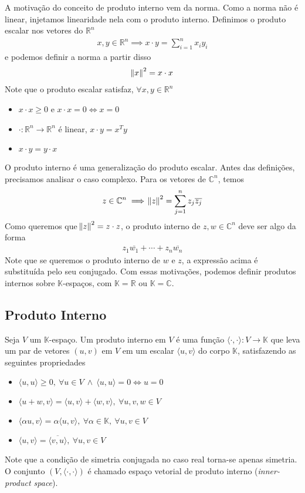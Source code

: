 \documentclass{article}
\newcommand{\K}{\mathbb{K}}
\newcommand{\inprod}[2]{\langle {#1}, {#2} \rangle}
\begin{document}
A motivação do conceito de produto interno vem da norma. Como a norma não é linear, injetamos linearidade nela com o produto interno. Definimos o produto escalar nos vetores do $\mathbb{R}^n$
\begin{align*}
    x,y \in \mathbb{R}^n \implies x \cdot y = \sum_{i=1}^n x_iy_i
\end{align*}
e podemos definir a norma a partir disso
\begin{align*}
    \norm{x}^2 = x \cdot x
\end{align*}
Note que o produto escalar satisfaz, $\forall x,y \in \mathbb{R}^n$
\begin{itemize}
    \item $x \cdot x \geq 0$ e $x \cdot x = 0 \iff x = 0$
    \item $\cdot: \mathbb{R}^{n} \to \mathbb{R}^n$ é linear, $x \cdot y = x^Ty$
    \item $x \cdot y = y \cdot x$
\end{itemize}
O produto interno é uma generalização do produto escalar. Antes das definições, precisamos analisar o caso complexo. Para os vetores de $\mathbb{C}^n$, temos
\begin{align*}
    z \in \mathbb{C}^n \implies \norm{z}^2 = \sum_{j=1}^n z_j\overline{z_j} 
\end{align*}
Como queremos que $\norm{z}^2 = z \cdot z$, o produto interno de $z, w \in \mathbb{C}^n$ deve ser algo da forma
\begin{align*}
    z_1\overline{w_1} + \cdots + z_n\overline{w_n}
\end{align*}
Note que se queremos o produto interno de $w$ e $z$, a expressão acima é substituída pelo seu conjugado. Com essas motivações, podemos definir produtos internos sobre $\K$-espaços, com $\K = \mathbb{R}$ ou $\K = \mathbb{C}$.

\subsection{Produto Interno}

Seja $V$ um $\K$-espaço. Um produto interno em $V$ é uma função $\inprod{\cdot}{\cdot} : V \to \K$ que leva um par de vetores $(u,v)$ em $V$ em um escalar $\inprod{u}{v}$ do corpo $\K$, satisfazendo as seguintes propriedades
\begin{itemize}
    \item $\inprod{u}{u} \geq 0,\:\forall u \in V \: \land \: \inprod{u}{u} = 0 \iff u = 0$
    \item $\inprod{u+w}{v} = \inprod{u}{v} + \inprod{w}{v},\:\forall u,v,w \in V$
    \item $\inprod{\alpha u}{v} = \alpha\inprod{u}{v},\:\forall \alpha \in \K,\:\forall u,v \in V$
    \item $\inprod{u}{v} = \overline{\inprod{v}{u}},\:\forall u,v \in V$
\end{itemize}
Note que a condição de simetria conjugada no caso real torna-se apenas simetria. O conjunto $(V, \inprod{\cdot}{\cdot})$ é chamado espaço vetorial de produto interno (\textit{inner-product space}).
\end{document}
